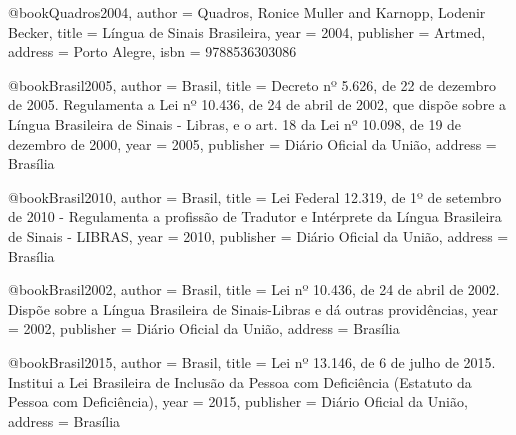 @book{Quadros2004,
  author = {Quadros, Ronice Muller and Karnopp, Lodenir Becker},
  title = {Língua de Sinais Brasileira},
  year = {2004},
  publisher = {Artmed},
  address = {Porto Alegre},
  isbn = {9788536303086}
}

@book{Brasil2005,
  author = {Brasil},
  title = {Decreto nº 5.626, de 22 de dezembro de 2005. Regulamenta a Lei nº 10.436, de 24 de abril de 2002, que dispõe sobre a Língua Brasileira de Sinais - Libras, e o art. 18 da Lei nº 10.098, de 19 de dezembro de 2000},
  year = {2005},
  publisher = {Diário Oficial da União},
  address = {Brasília}
}

@book{Brasil2010,
  author = {Brasil},
  title = {Lei Federal 12.319, de 1º de setembro de 2010 - Regulamenta a profissão de Tradutor e Intérprete da Língua Brasileira de Sinais - LIBRAS},
  year = {2010},
  publisher = {Diário Oficial da União},
  address = {Brasília}
}

@book{Brasil2002,
  author = {Brasil},
  title = {Lei nº 10.436, de 24 de abril de 2002. Dispõe sobre a Língua Brasileira de Sinais-Libras e dá outras providências},
  year = {2002},
  publisher = {Diário Oficial da União},
  address = {Brasília}
}

@book{Brasil2015,
  author = {Brasil},
  title = {Lei nº 13.146, de 6 de julho de 2015. Institui a Lei Brasileira de Inclusão da Pessoa com Deficiência (Estatuto da Pessoa com Deficiência)},
  year = {2015},
  publisher = {Diário Oficial da União},
  address = {Brasília}
}

